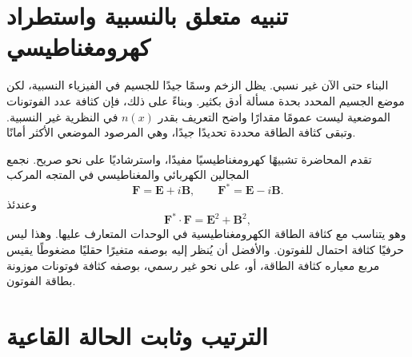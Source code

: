 \section{تنبيه متعلق بالنسبية واستطراد كهرومغناطيسي}

البناء حتى الآن غير نسبي. يظل الزخم وسمًا جيدًا للجسيم في الفيزياء النسبية، لكن موضع الجسيم المحدد بحدة مسألة أدق بكثير. وبناءً على ذلك، فإن كثافة عدد الفوتونات الموضعية ليست عمومًا مقدارًا واضح التعريف بقدر \(n(x)\) في النظرية غير النسبية. وتبقى كثافة الطاقة محددة تحديدًا جيدًا، وهي المرصود الموضعي الأكثر أمانًا.

تقدم المحاضرة تشبيهًا كهرومغناطيسيًا مفيدًا، واسترشاديًا على نحو صريح. نجمع المجالين الكهربائي والمغناطيسي في المتجه المركب
\begin{equation}
\mathbf F=\mathbf E+i\mathbf B,
\qquad
\mathbf F^*=\mathbf E-i\mathbf B.
\label{eq:l07-riemann-silberstein}
\end{equation}
وعندئذ
\begin{equation}
\mathbf F^*\mathbin{\cdot}\mathbf F
=\mathbf E^2+\mathbf B^2,
\label{eq:l07-em-density}
\end{equation}
وهو يتناسب مع كثافة الطاقة الكهرومغناطيسية في الوحدات المتعارف عليها. وهذا ليس حرفيًا كثافة احتمال للفوتون. والأفضل أن يُنظر إليه بوصفه متغيرًا حقليًا مضغوطًا يقيس مربع معياره كثافة الطاقة، أو، على نحو غير رسمي، بوصفه كثافة فوتونات موزونة بطاقة الفوتون.

\begin{classroomqa}
\end{classroomqa}

\begin{classroomqa}
\end{classroomqa}

\section{الترتيب وثابت الحالة القاعية}

